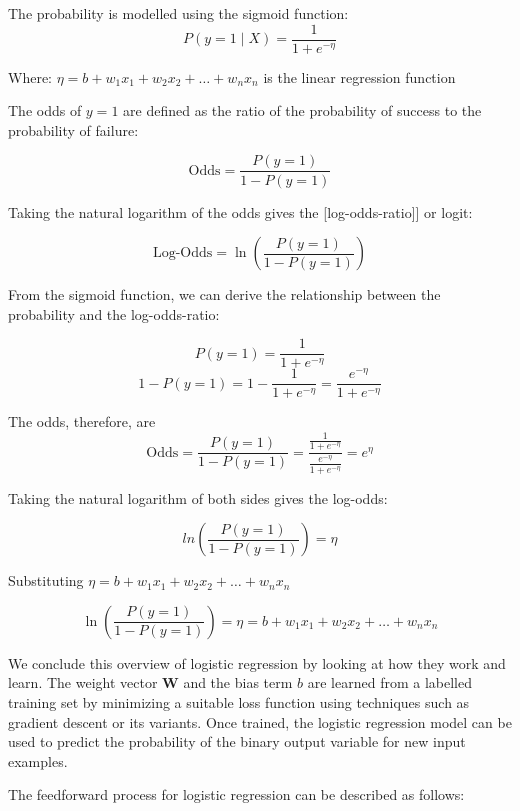 		The probability is modelled using the sigmoid function:
		$$P(y = 1 \mid X) = \frac{1}{1 + e^{-\eta}}$$
		
		Where:
		$\eta = b + w_1 x_1 + w_2 x_2 + \dots + w_n x_n$  is the linear regression function
		
		The odds of $y=1$ are defined as the ratio of the probability of success to the probability of failure:
		
		$$\text{Odds} = \frac{P(y = 1)}{1 - P(y = 1)}$$
		
		Taking the natural logarithm of the odds gives the 
		[log-odds-ratio]] or logit:
		
		$$\text{Log-Odds} = \ln\left(\frac{P(y = 1)}{1 - P(y = 1)}\right)$$
		
		From the sigmoid function, we can derive the relationship between the probability and the log-odds-ratio:
		
		$$P(y = 1) = \frac{1}{1 + e^{-\eta}}$$
		$$1 - P(y = 1) = 1 - \frac{1}{1 + e^{-\eta}} = \frac{e^{-\eta}}{1 + e^{-\eta}}$$
		
		The odds, therefore, are
		$$\text{Odds} = \frac{P(y = 1)}{1 - P(y = 1)} = \frac{\frac{1}{1 + e^{-\eta}}}{\frac{e^{-\eta}}{1 + e^{-\eta}}} = e^{\eta}$$
		
		
		Taking the natural logarithm of both sides gives the log-odds:
		
		$$ln\left(\frac{P(y = 1)}{1 - P(y = 1)}\right) = \eta$$
		
		Substituting $\eta = b + w_1 x_1 + w_2 x_2 + \dots + w_n x_n$
		
		\begin{equation}
			\ln\left(\frac{P(y = 1)}{1 - P(y = 1)}\right) = \eta = b + w_1 x_1 + w_2 x_2 + \dots + w_n x_n
		\end{equation}
		
		\bigskip
		
		We conclude this overview of logistic regression by looking at how they work and learn.	The weight vector $\textbf{W}$ and the bias term $b$ are learned from a labelled training set by minimizing a suitable loss function using techniques such as gradient descent or its variants. Once trained, the logistic regression model can be used to predict the probability of the binary output variable for new input examples.
		
		
		The feedforward process for logistic regression can be described as follows:
		
